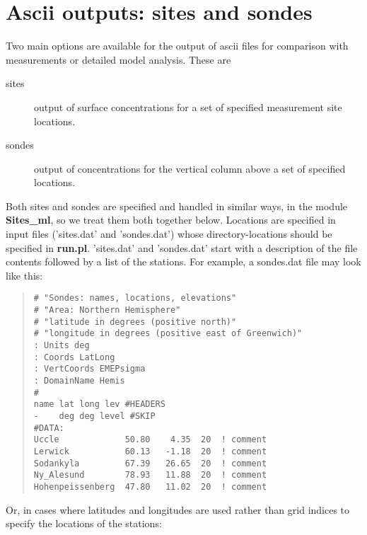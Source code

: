 \newpage
\section{Ascii outputs: sites and sondes}\label{sec:sitesonde}


Two main options are available for the output of ascii files for comparison
with measurements or detailed model analysis. These are

\begin{description}
\item[sites]  

      output of surface concentrations for a set of specified
      measurement site locations.
\item[sondes] 

      output of concentrations for the vertical column above
     a set of specified locations.
\end{description}

Both sites and sondes are specified and handled in similar ways, in
the module {\bf Sites\_ml}, so we treat them both together below.
Locations are specified in input files ('sites.dat' and 'sondes.dat')
whose directory-locations should be specified in {\bf run.pl}.
'sites.dat' and 'sondes.dat' start with a description of the file contents
followed by a list of the stations. For example, a sondes.dat file
may look like this:

\begin{small}
\begin{quote}
\begin{verbatim}
# "Sondes: names, locations, elevations"
# "Area: Northern Hemisphere"
# "latitude in degrees (positive north)"
# "longitude in degrees (positive east of Greenwich)"
: Units deg
: Coords LatLong
: VertCoords EMEPsigma
: DomainName Hemis
#
name lat long lev #HEADERS
-    deg deg level #SKIP
#DATA:
Uccle             50.80    4.35  20  ! comment
Lerwick           60.13   -1.18  20  ! comment
Sodankyla         67.39   26.65  20  ! comment
Ny_Alesund        78.93   11.88  20  ! comment
Hohenpeissenberg  47.80   11.02  20  ! comment
\end{verbatim}

\end{quote}
\end{small}
Or, in cases where latitudes and longitudes are used rather than grid
indices to specify the locations of the stations:

